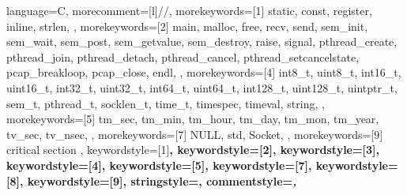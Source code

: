 %
%
%
\lstset{
	emph={%
    	critical,
    	section
    },
    emphstyle={\color{red}\bfseries}%
}%
{
    language=C,
    morecomment=[l]{//},
    morekeywords=[1]{%
        static,
        const,
        register,
        inline,
        strlen,
    },
    morekeywords=[2]{%
        main,
        malloc,
        free,
        recv,
        send,
        sem_init,
        sem_wait,
        sem_post,
        sem_getvalue,
        sem_destroy,
        raise,
        signal,
        pthread_create,
        pthread_join,
        pthread_detach,
        pthread_cancel,
        pthread_setcancelstate,
        pcap_breakloop,
        pcap_close,
        endl,
    },
    morekeywords=[4]{%
        int8_t,
        uint8_t,
        int16_t,
        uint16_t,
        int32_t,
        uint32_t,
        int64_t,
        uint64_t,
        int128_t,
        uint128_t,
        uintptr_t,
        sem_t,
        pthread_t,
        socklen_t,
        time_t,
        timespec,
        timeval,
        string,
    },
    morekeywords=[5]{%
        tm_sec,
        tm_min,
        tm_hour,
        tm_day,
        tm_mon,
        tm_year,
        tv_sec,
        tv_nsec,
    },
    morekeywords=[7]{%
        NULL,
        std,
        Socket,
    },
    morekeywords=[9]{
        critical section
    },
    keywordstyle=[1]\color{eclipse_keyword1}\bfseries,%
    keywordstyle=[2]\color{eclipse_keyword2}\bfseries,%
    keywordstyle=[3]\color{eclipse_keyword5},%
    keywordstyle=[4]\color{eclipse_keyword3},%
    keywordstyle=[5]\color{eclipse_keyword4},%
    keywordstyle=[7]\color{eclipse_keyword1},%
    keywordstyle=[8]\color{eclipse_keyword2},%
    keywordstyle=[9]\color{red}\bfseries,%
    stringstyle=\color{eclipse_string},
    commentstyle=\color{eclipse_comment}\itshape,
}
